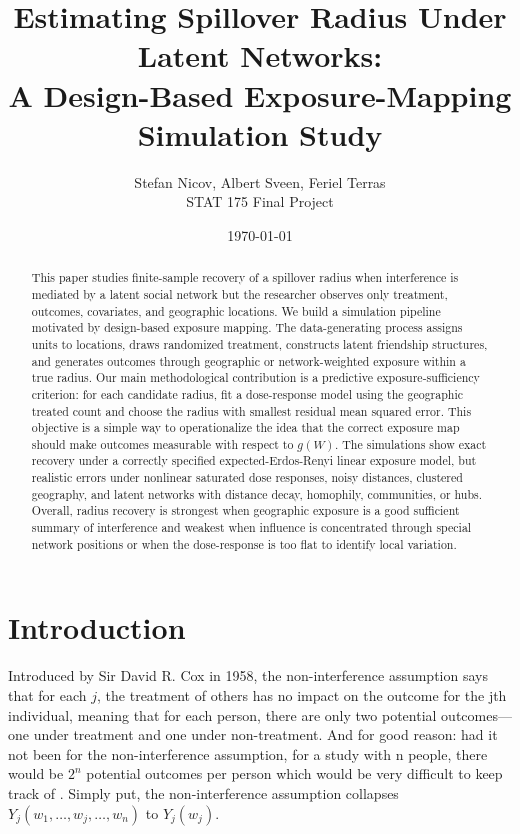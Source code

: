 \documentclass[11pt]{article}
\title{Estimating Spillover Radius Under Latent Networks:\\A Design-Based Exposure-Mapping Simulation Study}
\author{Stefan Nicov, Albert Sveen, Feriel Terras \\ STAT 175 Final Project}
\date{\today}
\begin{document}
\maketitle

\begin{abstract}
This paper studies finite-sample recovery of a spillover radius when interference is mediated by a latent social network but the researcher observes only treatment, outcomes, covariates, and geographic locations. We build a simulation pipeline motivated by design-based exposure mapping. The data-generating process assigns units to locations, draws randomized treatment, constructs latent friendship structures, and generates outcomes through geographic or network-weighted exposure within a true radius. Our main methodological contribution is a predictive exposure-sufficiency criterion: for each candidate radius, fit a dose-response model using the geographic treated count and choose the radius with smallest residual mean squared error. This objective is a simple way to operationalize the idea that the correct exposure map should make outcomes measurable with respect to $g(W)$. The simulations show exact recovery under a correctly specified expected-Erdos-Renyi linear exposure model, but realistic errors under nonlinear saturated dose responses, noisy distances, clustered geography, and latent networks with distance decay, homophily, communities, or hubs. Overall, radius recovery is strongest when geographic exposure is a good sufficient summary of interference and weakest when influence is concentrated through special network positions or when the dose-response is too flat to identify local variation.
\end{abstract}

\section{Introduction}
Introduced by Sir David R. Cox in 1958, the non-interference assumption says that for each $j$, the treatment of others has no impact on the outcome for the jth individual, meaning that for each person, there are only two potential outcomes—one under treatment and one under non-treatment. And for good reason: had it not been for the non-interference assumption, for a study with n people, there would be $2^n$ potential outcomes per person which would be very difficult to keep track of \cite[p.~332]{blitzstein-shephard}. Simply put, the non-interference assumption collapses $Y_j(w_1,\dots,w_j, \dots, w_n)$ to $Y_j(w_j)$. 
\end{document}
